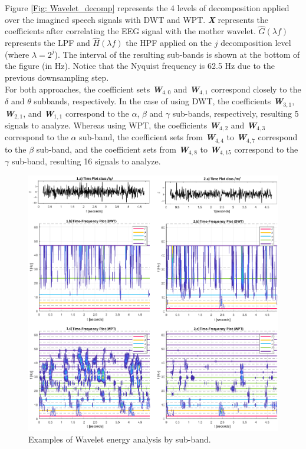 Figure \ref{Fig: Wavelet_decomp} represents the 4 levels of decomposition applied over the imagined speech signals with DWT and WPT.  \small\textbf{\textit{X}} represents the coefficients after correlating the EEG signal with the mother wavelet. $\hat{G}(\lambda f) $ represents the LPF and $\hat{H}(\lambda f)$ the HPF applied on the $j$  decomposition level (where $\lambda=2^{j}$). The interval of the resulting sub-bands is shown at the bottom of the figure (in Hz). Notice that the Nyquist frequency is 62.5 Hz due to the previous downsampling step.\\

For both approaches, the coefficient sets \textbf{\textit{W$_{4,0}$}} and \textbf{\textit{W$_{4,1}$}} correspond closely to the $\delta$ and $\theta$ subbands, respectively. In the case of using DWT, the coefficients \textbf{\textit{W$_{3,1}$}}, \textbf{\textit{W$_{2,1}$}}, and \textbf{\textit{W$_{1,1}$}} correspond to the $\alpha$, $\beta$ and $\gamma$ sub-bands, respectively, resulting 5 signals to analyze. Whereas using WPT, the coefficients \textbf{\textit{W$_{4,2}$}} and \textbf{\textit{W$_{4,3}$}} correspond to the $\alpha$ sub-band, the coefficient sets from \textbf{\textit{W$_{4,4}$}} to \textbf{\textit{W$_{4,7}$}} correspond to the $\beta$ sub-band, and the coefficient sets from \textbf{\textit{W$_{4,8}$}} to \textbf{\textit{W$_{4,15}$}} correspond to the $\gamma$ sub-band, resulting 16 signals to analyze.\\

\begin{figure}[h!]
	\includegraphics[width=\linewidth]{Figures/Time_Freq_Wavelet.png}
	\centering
	\caption{Examples of Wavelet energy analysis by sub-band.}
	\label{Fig: Wavelet_freq_time}
\end{figure}

